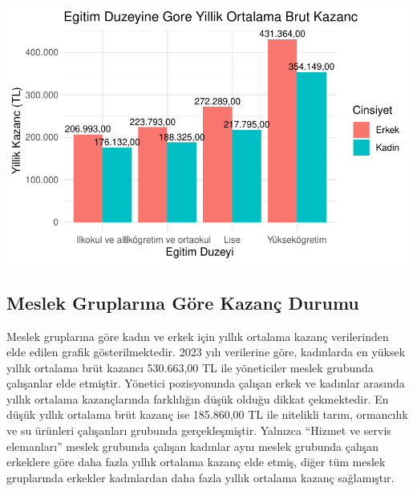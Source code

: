 \documentclass[
  11pt,
  a4paper,
  DIV=11,
  numbers=noendperiod]{scrartcl}
\begin{document}
\includegraphics{project_files/figure-pdf/unnamed-chunk-4-1.pdf}

\subsection{Meslek Gruplarına Göre Kazanç
Durumu}\label{meslek-gruplarux131na-guxf6re-kazanuxe7-durumu}

Meslek gruplarına göre kadın ve erkek için yıllık ortalama kazanç
verilerinden elde edilen grafik gösterilmektedir. 2023 yılı verilerine
göre, kadınlarda en yüksek yıllık ortalama brüt kazancı 530.663,00 TL
ile yöneticiler meslek grubunda çalışanlar elde etmiştir. Yönetici
pozisyonunda çalışan erkek ve kadınlar arasında yıllık ortalama
kazançlarında farklılığın düşük olduğu dikkat çekmektedir. En düşük
yıllık ortalama brüt kazanç ise 185.860,00 TL ile nitelikli tarım,
ormancılık ve su ürünleri çalışanları grubunda gerçekleşmiştir. Yalnızca
``Hizmet ve servis elemanları'' meslek grubunda çalışan kadınlar aynı
meslek grubunda çalışan erkeklere göre daha fazla yıllık ortalama kazanç
elde etmiş, diğer tüm meslek gruplarında erkekler kadınlardan daha fazla
yıllık ortalama kazanç sağlamıştır.
\end{document}
